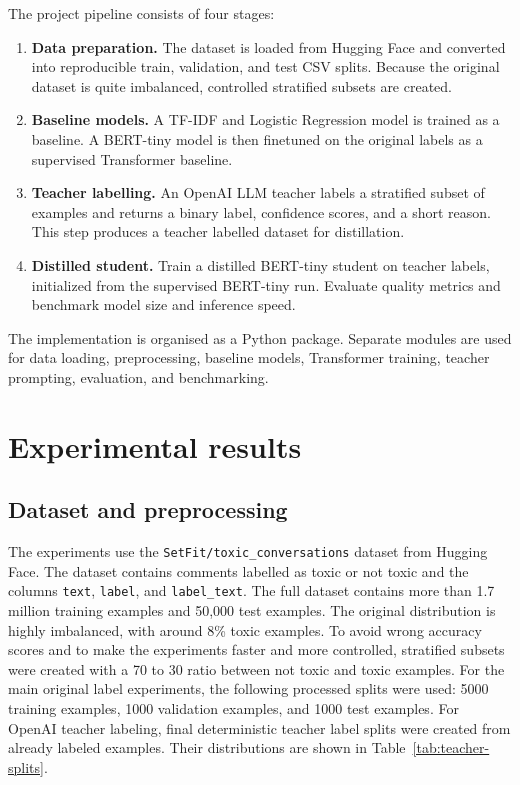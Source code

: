 \documentclass[pdflatex,sn-mathphys-num]{sn-jnl}
\begin{document}
The project pipeline consists of four stages:

\begin{enumerate}
    \item \textbf{Data preparation.} The dataset is loaded from Hugging Face and converted into reproducible train, validation, and test CSV splits. 
    Because the original dataset is quite imbalanced, controlled stratified subsets are created.
    \item \textbf{Baseline models.} A TF-IDF and Logistic Regression model is trained as a baseline. 
    A BERT-tiny model is then finetuned on the original labels as a supervised Transformer baseline.
    \item \textbf{Teacher labelling.} An OpenAI LLM teacher labels a stratified subset of examples and returns a binary label, confidence scores, and a short reason. 
    This step produces a teacher labelled dataset for distillation.
    \item \textbf{Distilled student.} Train a distilled BERT-tiny student on teacher labels, initialized from the supervised BERT-tiny run. 
    Evaluate quality metrics and benchmark model size and inference speed.
\end{enumerate}

The implementation is organised as a Python package.
Separate modules are used for data loading, preprocessing, baseline models, Transformer training, teacher prompting, evaluation, and benchmarking. 

\section{Experimental results}\label{sec:results}

\subsection{Dataset and preprocessing}

The experiments use the \texttt{SetFit/toxic\_conversations} dataset from Hugging Face.
The dataset contains comments labelled as toxic or not toxic and the columns \texttt{text}, \texttt{label}, and \texttt{label\_text}. 
The full dataset contains more than 1.7 million training examples and 50,000 test examples.
The original distribution is highly imbalanced, with around 8\% toxic examples. 
To avoid wrong accuracy scores and to make the experiments faster and more controlled, stratified subsets were created with a 70 to 30 ratio between not toxic and toxic examples.
For the main original label experiments, the following processed splits were used: 5000 training examples, 1000 validation examples, and 1000 test examples. 
For OpenAI teacher labeling, final deterministic teacher label splits were created from already labeled examples. 
Their distributions are shown in Table~\ref{tab:teacher-splits}.
\end{document}
